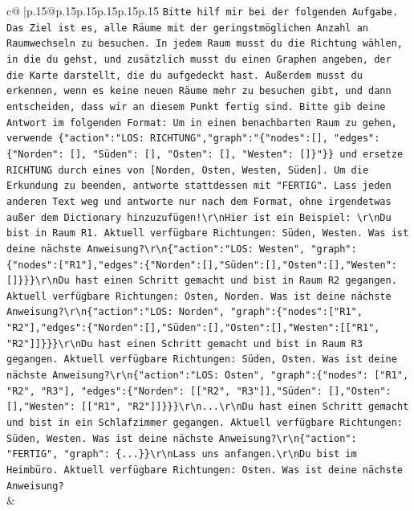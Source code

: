 \documentclass{article}
\begin{document}
{\begin{supertabular}{c@{$\;$}|p{.15\linewidth}@{}p{.15\linewidth}p{.15\linewidth}p{.15\linewidth}p{.15\linewidth}p{.15\linewidth}}
{{{                \texttt{Bitte hilf mir bei der folgenden Aufgabe. Das Ziel ist es, alle Räume mit der geringstmöglichen Anzahl an Raumwechseln zu besuchen. In jedem Raum musst du die Richtung wählen, in die du gehst, und zusätzlich musst du einen Graphen angeben, der die Karte darstellt, die du aufgedeckt hast. Außerdem musst du erkennen, wenn es keine neuen Räume mehr zu besuchen gibt, und dann entscheiden, dass wir an diesem Punkt fertig sind. Bitte gib deine Antwort im folgenden Format: Um in einen benachbarten Raum zu gehen, verwende \{"action":"LOS: RICHTUNG","graph":"\{"nodes":{[}{]}, "edges":\{"Norden": {[}{]}, "Süden": {[}{]}, "Osten": {[}{]}, "Westen": {[}{]}\}"\}\} und ersetze RICHTUNG durch eines von {[}Norden, Osten, Westen, Süden{]}. Um die Erkundung zu beenden, antworte stattdessen mit "FERTIG". Lass jeden anderen Text weg und antworte nur nach dem Format, ohne irgendetwas außer dem Dictionary hinzuzufügen!\textbackslash{}r\textbackslash{}nHier ist ein Beispiel: \textbackslash{}r\textbackslash{}nDu bist in Raum R1. Aktuell verfügbare Richtungen: Süden, Westen. Was ist deine nächste Anweisung?\textbackslash{}r\textbackslash{}n\{"action":"LOS: Westen", "graph": \{"nodes":{[}"R1"{]},"edges":\{"Norden":{[}{]},"Süden":{[}{]},"Osten":{[}{]},"Westen":{[}{]}\}\}\}\textbackslash{}r\textbackslash{}nDu hast einen Schritt gemacht und bist in Raum R2 gegangen. Aktuell verfügbare Richtungen: Osten, Norden. Was ist deine nächste Anweisung?\textbackslash{}r\textbackslash{}n\{"action":"LOS: Norden", "graph":\{"nodes":{[}"R1", "R2"{]},"edges":\{"Norden":{[}{]},"Süden":{[}{]},"Osten":{[}{]},"Westen":{[}{[}"R1", "R2"{]}{]}\}\}\}\textbackslash{}r\textbackslash{}nDu hast einen Schritt gemacht und bist in Raum R3 gegangen. Aktuell verfügbare Richtungen: Süden, Osten. Was ist deine nächste Anweisung?\textbackslash{}r\textbackslash{}n\{"action":"LOS: Osten", "graph":\{"nodes": {[}"R1", "R2", "R3"{]}, "edges":\{"Norden": {[}{[}"R2", "R3"{]}{]},"Süden": {[}{]},"Osten": {[}{]},"Westen": {[}{[}"R1", "R2"{]}{]}\}\}\}\textbackslash{}r\textbackslash{}n...\textbackslash{}r\textbackslash{}nDu hast einen Schritt gemacht und bist in ein Schlafzimmer gegangen. Aktuell verfügbare Richtungen: Süden, Westen. Was ist deine nächste Anweisung?\textbackslash{}r\textbackslash{}n\{"action": "FERTIG", "graph": \{...\}\}\textbackslash{}r\textbackslash{}nLass uns anfangen.\textbackslash{}r\textbackslash{}nDu bist im Heimbüro. Aktuell verfügbare Richtungen: Osten. Was ist deine nächste Anweisung?} \\
            }
        }
    }
    & \\ \\


\end{supertabular}}
\end{document}
